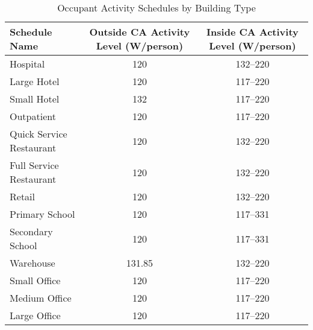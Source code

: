 \begin{table}
\small
\centering
\caption[Occupant Activity Schedules]{Occupant Activity Schedules by Building Type}
\label{tab:activity_schedule}
\begin{tabular}{|l|c|c|} 
\hline
\textbf{Schedule Name}      & \textbf{Outside CA Activity Level (W/person)} & \textbf{Inside CA Activity Level (W/person)}  \\ 
\hline
Hospital                    & 120           & 132--220                      \\ 
\hline
Large Hotel                 & 120           & 117--220                       \\ 
\hline
Small Hotel                 & 132           & 117--220                         \\ 
\hline
Outpatient                  & 120            & 117--220                   \\ 
\hline
Quick Service Restaurant    & 120           & 132--220                           \\ 
\hline
Full Service Restaurant     & 120           & 132--220                        \\ 
\hline
Retail                      & 120       & 132--220                          \\ 
\hline
Primary School              & 120       & 117--331                            \\ 
\hline
Secondary School            & 120          & 117--331                       \\ 
\hline
Warehouse                   & 131.85        & 132--220                          \\ 
\hline
Small Office                & 120        & 117--220                         \\ 
\hline
Medium Office               & 120            & 117--220                     \\ 
\hline
Large Office                & 120          & 117--220                       \\
\hline
\end{tabular}
\end{table}